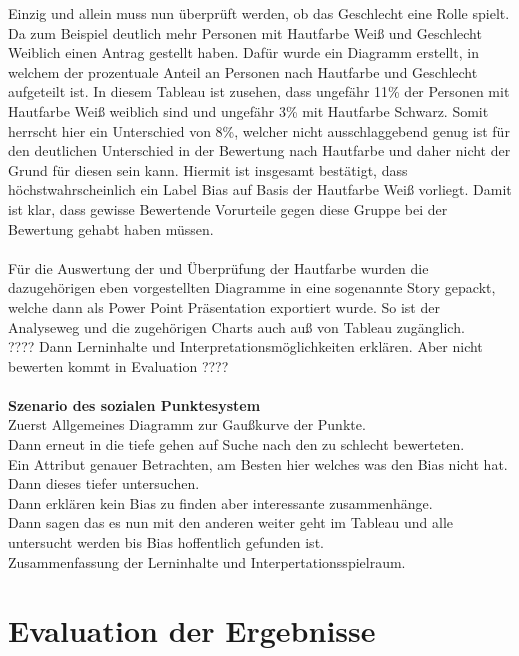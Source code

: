 \begin{onehalfspace}
Einzig und allein muss nun überprüft werden, ob das Geschlecht eine Rolle spielt. Da zum Beispiel deutlich mehr Personen mit Hautfarbe Wei{\ss} und Geschlecht Weiblich einen Antrag gestellt haben. Dafür wurde ein Diagramm erstellt, in welchem der prozentuale Anteil an Personen nach Hautfarbe und Geschlecht aufgeteilt ist. In diesem Tableau ist zusehen, dass ungefähr 11\% der Personen mit Hautfarbe Wei{\ss} weiblich sind und ungefähr 3\% mit Hautfarbe Schwarz. Somit herrscht hier ein Unterschied von 8\%, welcher nicht ausschlaggebend genug ist für den deutlichen Unterschied in der Bewertung nach Hautfarbe und daher nicht der Grund für diesen sein kann. Hiermit ist insgesamt bestätigt, dass höchstwahrscheinlich ein Label Bias auf Basis der Hautfarbe Wei{\ss} vorliegt. Damit ist klar, dass gewisse Bewertende Vorurteile gegen diese Gruppe bei der Bewertung gehabt haben müssen.\\\\
Für die Auswertung der und Überprüfung der Hautfarbe wurden die dazugehörigen eben vorgestellten Diagramme in eine sogenannte Story gepackt, welche dann als Power Point Präsentation exportiert wurde. So ist der Analyseweg und die zugehörigen Charts auch au{\ss} von Tableau zugänglich.\\
???? Dann Lerninhalte und Interpretationsmöglichkeiten erklären. Aber nicht bewerten kommt in Evaluation ???? \\\\
\textbf{Szenario des sozialen Punktesystem}\\

Zuerst Allgemeines Diagramm zur Gaußkurve der Punkte.\\
Dann erneut in die tiefe gehen auf Suche nach den zu schlecht bewerteten.\\
Ein Attribut genauer Betrachten, am Besten hier welches was den Bias nicht hat.\\
Dann dieses tiefer untersuchen.\\
Dann erklären kein Bias zu finden aber interessante zusammenhänge.\\
Dann sagen das es nun mit den anderen weiter geht im Tableau und alle untersucht werden bis Bias hoffentlich gefunden ist.\\
Zusammenfassung der Lerninhalte und Interpertationsspielraum.
\section{Evaluation der Ergebnisse}
\label{evaluation}
\end{onehalfspace}